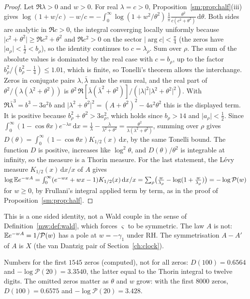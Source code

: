 \begin{proof}
Let $\Re\lambda>0$ and $w>0$. For real $\lambda=c>0$, Proposition~\ref{sm:prop:half}(iii) gives $\log(1+w/c)-w/c=-\int_0^\infty\log(1+w^2/\theta^2)\,\frac1\pi\frac{\theta^2}{c(c^2+\theta^2)}\,\mathrm d\theta$. Both sides are analytic in $\Re c>0$, the integral converging locally uniformly because $\lvert c^2+\theta^2\rvert\ge\Re c^2+\theta^2$ and $\Re c^2>0$ on the sector $\lvert\arg c\rvert<\frac\pi4$ (the zeros have $\lvert a_\rho\rvert<\frac12<b_\rho$), so the identity continues to $c=\lambda_\rho$. Sum over $\rho$. The sum of the absolute values is dominated by the real case with $c=b_\rho$, up to the factor $b_\rho^2/(b_\rho^2-\frac14)\le1.01$, which is finite, so Tonelli's theorem allows the interchange. Zeros in conjugate pairs $\lambda,\bar\lambda$ make the sum real, and the real part of $\theta^2/(\lambda(\lambda^2+\theta^2))$ is $\theta^2\,\Re[\bar\lambda(\bar\lambda^2+\theta^2)]/(\lvert\lambda\rvert^2\lvert\lambda^2+\theta^2\rvert^2)$. With $\Re\bar\lambda^3=b^3-3a^2b$ and $\lvert\lambda^2+\theta^2\rvert^2=(A+\theta^2)^2-4a^2\theta^2$ this is the displayed term. It is positive because $b_\rho^2+\theta^2>3a_\rho^2$, which holds since $b_\rho>14$ and $\lvert a_\rho\rvert<\frac12$. Since $\int_0^\infty(1-\cos\theta x)e^{-\lambda x}\,\mathrm dx=\frac1\lambda-\frac\lambda{\lambda^2+\theta^2}=\frac{\theta^2}{\lambda(\lambda^2+\theta^2)}$, summing over $\rho$ gives $D(\theta)=\int_0^\infty(1-\cos\theta x)K_{1/2}(x)\,\mathrm dx$, by the same Tonelli bound. The function $D$ is positive, increases like $\log^2\theta$, and $D(\theta)/\theta^2$ is integrable at infinity, so the measure is a Thorin measure. For the last statement, the Lévy measure $K_{1/2}(x)\,\mathrm dx/x$ of $A$ gives $\log\mathbb{E} e^{-wA}=\int_0^\infty(e^{-wx}+wx-1)K_{1/2}(x)\,\mathrm dx/x=\sum_\rho\bigl(\frac w{\lambda_\rho}-\log(1+\frac w{\lambda_\rho})\bigr)=-\log\mathcal P(w)$ for $w\ge0$, by Frullani's integral applied term by term, as in the proof of Proposition~\ref{sm:prop:half}.
\end{proof}

This is a one sided identity, not a Wald couple in the sense of Definition~\ref{mw:def:wald}, which forces $\varsigma$ to be symmetric. The law $A$ is not: $\mathbb{E} e^{-wA}=1/\mathcal P(w)$ has a pole at $w=-\gamma_1$ under RH. The symmetrisation $A-A'$ of $A$ is $X$ (the van Dantzig pair of Section~\ref{ch:clock}).

Numbers for the first $1545$ zeros (computed), not for all zeros: $D(100)=0.6564$ and $-\log\mathcal P(20)=3.3540$, the latter equal to the Thorin integral to twelve digits. The omitted zeros matter as $\theta$ and $w$ grow: with the first $8000$ zeros, $D(100)=0.6575$ and $-\log\mathcal P(20)=3.428$.

